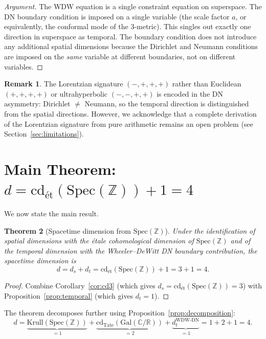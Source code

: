 \documentclass[12pt,a4paper]{article}
\newtheorem{theorem}{Theorem}[section]
\theoremstyle{definition}
\newtheorem{remark}[theorem]{Remark}
\newcommand{\Spec}{\mathrm{Spec}}
\newcommand{\Gal}{\mathrm{Gal}}
\newcommand{\cd}{\mathrm{cd}}
\newcommand{\Krull}{\mathrm{Krull}}
\newcommand{\ZZ}{\mathbb{Z}}
\newcommand{\RR}{\mathbb{R}}
\newcommand{\CC}{\mathbb{C}}
\begin{document}
\begin{proof}[Argument]
The WDW equation is a single constraint equation on superspace. The DN boundary
condition is imposed on a single variable (the scale factor $a$, or equivalently,
the conformal mode of the 3-metric). This singles out exactly one direction in
superspace as temporal. The boundary condition does not introduce any additional
spatial dimensions because the Dirichlet and Neumann conditions are imposed on the
\emph{same} variable at different boundaries, not on different variables.
\end{proof}

\begin{remark}
The Lorentzian signature $(-, +, +, +)$ rather than Euclidean $(+, +, +, +)$ or
ultrahyperbolic $(-, -, +, +)$ is encoded in the DN asymmetry: Dirichlet $\neq$
Neumann, so the temporal direction is distinguished from the spatial directions.
However, we acknowledge that a complete derivation of the Lorentzian signature from
pure arithmetic remains an open problem (see Section~\ref{sec:limitations}).
\end{remark}

\section{Main Theorem: $d = \cd_{\text{\'et}}(\Spec(\ZZ)) + 1 = 4$}\label{sec:main}

We now state the main result.

\begin{theorem}[Spacetime dimension from $\Spec(\ZZ)$]\label{thm:main}
Under the identification of spatial dimensions with the \'etale cohomological
dimension of $\Spec(\ZZ)$ and of the temporal dimension with the Wheeler--DeWitt
DN boundary contribution, the spacetime dimension is
\[
  d = d_s + d_t = \cd_{\text{\'et}}(\Spec(\ZZ)) + 1 = 3 + 1 = 4.
\]
\end{theorem}

\begin{proof}
Combine Corollary~\ref{cor:cd3} (which gives $d_s = \cd_{\text{\'et}}(\Spec(\ZZ)) = 3$)
with Proposition~\ref{prop:temporal} (which gives $d_t = 1$).
\end{proof}

The theorem decomposes further using Proposition~\ref{prop:decomposition}:
\[
  d = \underbrace{\Krull(\Spec(\ZZ))}_{= 1} +
      \underbrace{\cd_{\mathrm{Tate}}(\Gal(\CC/\RR))}_{= 2} +
      \underbrace{d_t^{\text{WDW-DN}}}_{= 1} = 1 + 2 + 1 = 4.
\]
\end{document}

